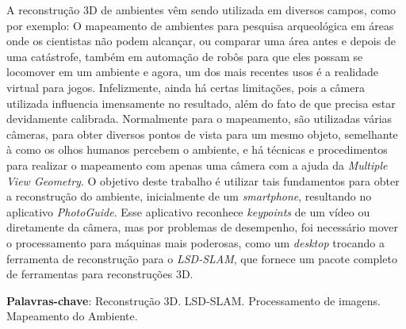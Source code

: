 \setlength{\absparsep}{18pt} %
\begin{resumo}
A reconstrução 3D de ambientes vêm sendo utilizada em diversos campos, como por exemplo: O mapeamento de ambientes para pesquisa arqueológica em áreas onde os cientistas não podem alcançar, ou comparar uma área antes e depois de uma catástrofe\cite{SLAMAP}, também em automação de robôs para que eles possam se locomover em um ambiente e agora, um dos mais recentes usos é a realidade virtual para jogos. Infelizmente, ainda há certas limitações, pois a câmera utilizada influencia imensamente no resultado, além do fato de que precisa estar devidamente calibrada. Normalmente para o mapeamento, são utilizadas várias câmeras, para obter diversos pontos de vista para um mesmo objeto, semelhante à como os olhos humanos percebem o ambiente, e há técnicas e procedimentos para realizar o mapeamento com apenas uma câmera com a ajuda da \textit{Multiple View Geometry}. O objetivo deste trabalho é utilizar tais fundamentos para obter a reconstrução do ambiente, inicialmente de um \textit{smartphone}, resultando no aplicativo \textit{PhotoGuide}. Esse aplicativo reconhece \textit{keypoints} de um vídeo ou diretamente da câmera, mas por problemas de desempenho, foi necessário mover o processamento para máquinas mais poderosas, como um \textit{desktop} trocando a ferramenta de reconstrução para o \textit{LSD-SLAM}, que fornece um pacote completo de ferramentas para reconstruções 3D. 

 \textbf{Palavras-chave}: Reconstrução 3D. LSD-SLAM. Processamento de imagens. Mapeamento do Ambiente.

\end{resumo}
